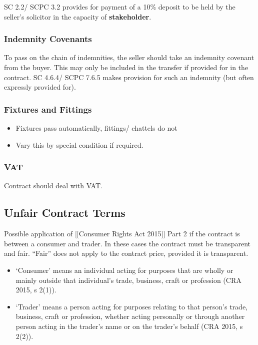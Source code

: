 \documentclass[
]{article}
\providecommand{\tightlist}{%
  \setlength{\itemsep}{0pt}\setlength{\parskip}{0pt}}
\begin{document}
SC 2.2/ SCPC 3.2 provides for payment of a 10\% deposit to be held by
the seller's solicitor in the capacity of \textbf{stakeholder}.

\hypertarget{indemnity-covenants}{%
\subsubsection{Indemnity Covenants}\label{indemnity-covenants}}

To pass on the chain of indemnities, the seller should take an indemnity
covenant from the buyer. This may only be included in the transfer if
provided for in the contract. SC 4.6.4/ SCPC 7.6.5 makes provision for
such an indemnity (but often expressly provided for).

\hypertarget{fixtures-and-fittings}{%
\subsubsection{Fixtures and Fittings}\label{fixtures-and-fittings}}

\begin{itemize}
\tightlist
\item
  Fixtures pass automatically, fittings/ chattels do not
\item
  Vary this by special condition if required.
\end{itemize}

\hypertarget{vat}{%
\subsubsection{VAT}\label{vat}}

Contract should deal with VAT.

\hypertarget{unfair-contract-terms}{%
\subsection{Unfair Contract Terms}\label{unfair-contract-terms}}

Possible application of {[}{[}Consumer Rights Act 2015{]}{]} Part 2 if
the contract is between a consumer and trader. In these cases the
contract must be transparent and fair. ``Fair'' does not apply to the
contract price, provided it is transparent.

\begin{itemize}
\tightlist
\item
  `Consumer' means an individual acting for purposes that are wholly or
  mainly outside that individual's trade, business, craft or profession
  (CRA 2015, s 2(1)).
\item
  `Trader' means a person acting for purposes relating to that person's
  trade, business, craft or profession, whether acting personally or
  through another person acting in the trader's name or on the trader's
  behalf (CRA 2015, s 2(2)).
\end{itemize}
\end{document}
